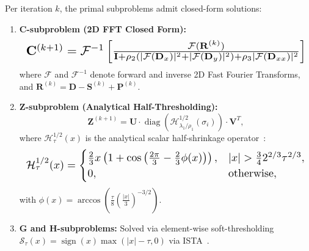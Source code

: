 \documentclass[journal]{IEEEtran}
\begin{document}
Per iteration $k$, the primal subproblems admit closed-form solutions:
\begin{enumerate}
    \item \textbf{$\mathbf{C}$-subproblem (2D FFT Closed Form):}
    \begin{equation}
    \resizebox{0.95\linewidth}{!}{$
        \mathbf{C}^{(k+1)} = \mathcal{F}^{-1} \left[ \frac{\mathcal{F}(\mathbf{R}^{(k)})}{\mathbf{I} + \rho_2 (|\mathcal{F}(\mathbf{D}_x)|^2 + |\mathcal{F}(\mathbf{D}_y)|^2) + \rho_3 |\mathcal{F}(\mathbf{D}_{xx})|^2} \right]
    $}
    \end{equation}
    where $\mathcal{F}$ and $\mathcal{F}^{-1}$ denote forward and inverse 2D Fast Fourier Transforms, and $\mathbf{R}^{(k)} = \mathbf{D} - \mathbf{S}^{(k)} + \mathbf{P}^{(k)}$.
    \item \textbf{$\mathbf{Z}$-subproblem (Analytical Half-Thresholding):}
    \begin{equation}
        \mathbf{Z}^{(k+1)} = \mathbf{U} \cdot \operatorname{diag}\left( \mathcal{H}_{\lambda_1 / \rho_1}^{1/2}(\sigma_i) \right) \cdot \mathbf{V}^T,
    \end{equation}
    where $\mathcal{H}_\tau^{1/2}(x)$ is the analytical scalar half-shrinkage operator~\cite{liu2026multistage}:
    \begin{equation}
    \resizebox{0.95\linewidth}{!}{$
        \mathcal{H}_\tau^{1/2}(x) = \begin{cases}
            \frac{2}{3} x \left( 1 + \cos\left( \frac{2\pi}{3} - \frac{2}{3} \phi(x) \right) \right), & |x| > \frac{3}{4} 2^{2/3} \tau^{2/3}, \\
            0, & \text{otherwise},
        \end{cases}
    $}
    \end{equation}
    with $\phi(x) = \arccos\left( \frac{\tau}{8} \left( \frac{|x|}{3} \right)^{-3/2} \right)$.
    \item \textbf{$\mathbf{G}$ and $\mathbf{H}$-subproblems:} Solved via element-wise soft-thresholding $\mathcal{S}_\tau(x) = \operatorname{sign}(x) \max(|x| - \tau, 0)$ via ISTA~\cite{beck2009ista}.
\end{enumerate}
\end{document}
